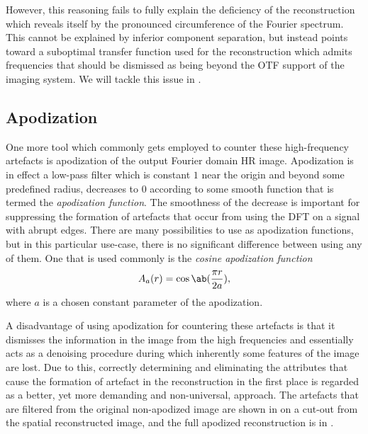 However, this reasoning fails to fully explain the deficiency of the reconstruction which reveals itself by the pronounced
    circumference of the Fourier spectrum.
This cannot be explained by inferior component separation, but instead points toward a suboptimal transfer function
    used for the reconstruction which admits frequencies that should be dismissed as being beyond the \ac{OTF} support 
    of the imaging system.
We will tackle this issue in .

\subsection{Apodization}
One more tool which commonly gets employed to counter these high-frequency artefacts is apodization of the output 
    Fourier domain \ac{HR} image.
Apodization is in effect a low-pass filter which is constant \(1\) near the origin and beyond some predefined radius, 
    decreases to \(0\) according to some smooth function that is termed the \emph{apodization function}. 
The smoothness of the decrease is important for suppressing the formation of artefacts that occur from using the 
    \ac{DFT} on a signal with abrupt edges.
There are many possibilities to use as apodization functions, but in this particular use-case, there is no significant 
    difference between using any of them.
One that is used commonly is the \emph{cosine apodization function}
    \begin{equation*}
        A_{a}(r) = \cos\ab(\frac{\pi r}{2a}),
    \end{equation*}
    where \(a\) is a chosen constant parameter of the apodization.
\begin{marginfigure}
    \caption{The apodization filter used in .}
\end{marginfigure}

A disadvantage of using apodization for countering these artefacts is that it dismisses the information in the image
    from the high frequencies and essentially acts as a denoising procedure during which inherently some features of the
    image are lost.
Due to this, correctly determining and eliminating the attributes that cause the formation of artefact in the
    reconstruction in the first place is regarded as a better, yet more demanding and non-universal, approach.
The artefacts that are filtered from the original non-apodized image are shown in 
     on a cut-out from the spatial reconstructed image, and the full apodized
    reconstruction is in .

